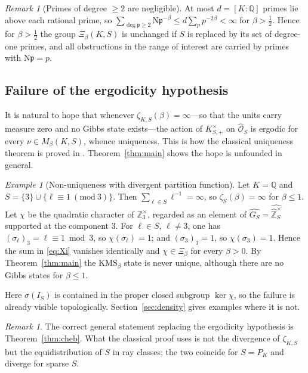 \documentclass[11pt]{amsart}
\numberwithin{equation}{section}
\theoremstyle{definition}
\theoremstyle{remark}
\newtheorem{remark}[theorem]{Remark}
\newtheorem{example}[theorem]{Example}
\newcommand{\Z}{\mathbb{Z}}
\newcommand{\Q}{\mathbb{Q}}
\newcommand{\hZ}{\widehat{\Z}}
\newcommand{\Ns}{\mathrm{N}}
\newcommand{\cO}{\mathcal{O}}
\newcommand{\pp}{\mathfrak{p}}
\newcommand{\hOS}{\widehat{\cO}_S}
\begin{document}
\begin{remark}[Primes of degree $\ge2$ are negligible]\label{rem:degree}
At most $d=[K:\Q]$ primes lie above each rational prime, so
$\sum_{\deg\pp\ge2}\Ns\pp^{-\beta}\le d\sum_pp^{-2\beta}<\infty$ for
$\beta>\tfrac12$. Hence for $\beta>\tfrac12$ the group $\Xi_\beta(K,S)$ is
unchanged if $S$ is replaced by its set of degree-one primes, and all
obstructions in the range of interest are carried by primes with $\Ns\pp=p$.
\end{remark}

\subsection{Failure of the ergodicity hypothesis}

It is natural to hope that whenever $\zeta_{K,S}(\beta)=\infty$---so that the
units carry measure zero and no Gibbs state exists---the action of
$K^\times_{S,+}$ on $\hOS$ is ergodic for every $\nu\in M_\beta(K,S)$, whence
uniqueness. This is how the classical uniqueness theorem is proved in
\cite{Nesh02}. Theorem~\ref{thm:main} shows the hope is unfounded in general.

\begin{example}[Non-uniqueness with divergent partition function]\label{ex:first}
Let $K=\Q$ and $S=\{3\}\cup\{\ell\equiv1\ (\mathrm{mod}\ 3)\}$. Then
$\sum_{\ell\in S}\ell^{-1}=\infty$, so $\zeta_S(\beta)=\infty$ for $\beta\le1$.
Let $\chi$ be the quadratic character of $\Z_3^\times$, regarded as an element
of $\widehat{G_S}=\widehat{\hZ_S^\times}$ supported at the component $3$. For
$\ell\in S$, $\ell\neq3$, one has $(\sigma_\ell)_3=\ell\equiv1\bmod3$, so
$\chi(\sigma_\ell)=1$; and $(\sigma_3)_3=1$, so $\chi(\sigma_3)=1$. Hence the
sum in \eqref{eq:Xi} vanishes identically and $\chi\in\Xi_\beta$ for every
$\beta>0$. By Theorem~\ref{thm:main} the $\mathrm{KMS}_\beta$ state is never
unique, although there are no Gibbs states for $\beta\le1$.

Here $\sigma(I_S)$ is contained in the proper closed subgroup $\ker\chi$, so
the failure is already visible topologically. Section~\ref{sec:density} gives
examples where it is not.
\end{example}

\begin{remark}
The correct general statement replacing the ergodicity hypothesis is
Theorem~\ref{thm:cheb}. What the classical proof uses is not the divergence of
$\zeta_{K,S}$ but the equidistribution of $S$ in ray classes; the two coincide
for $S=P_K$ and diverge for sparse $S$.
\end{remark}
\end{document}
